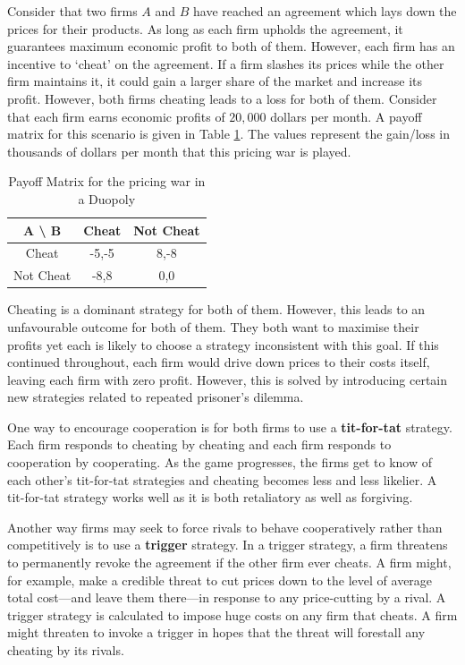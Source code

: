 \documentclass{article}
\theoremstyle{definition}
\begin{document}
Consider that two firms $A$ and $B$ have reached an agreement which lays down the prices for their products. As long as each firm upholds the agreement, it guarantees maximum economic profit to both of them. However, each firm has an incentive to `cheat' on the agreement. If a firm slashes its prices while the other firm maintains it, it could gain a larger share of the market and increase its profit. However, both firms cheating leads to a loss for both of them. Consider that each firm earns economic profits of $20,000$ dollars per month. A payoff matrix for this scenario is given in Table \ref{table:duopoly}. The values represent the gain/loss in thousands of dollars per month that this pricing war is played. 

\begin{table}[H]
    \begin{adjustbox}{width=5cm,center}
    \begin{tabular}{|c|c|c|}
        \hline
        A \textbackslash \: B & Cheat & Not Cheat \\
        \hline
        Cheat & -5,-5 & 8,-8 \\
        \hline 
        Not Cheat & -8,8 & 0,0  \\
        \hline
    \end{tabular}
    \end{adjustbox}
    \caption{Payoff Matrix for the pricing war in a Duopoly}
    \label{table:duopoly}
\end{table}

Cheating is a dominant strategy for both of them. However, this leads to an unfavourable outcome for both of them. They both want to maximise their profits yet each is likely to choose a strategy inconsistent with this goal. If this continued throughout, each firm would drive down prices to their costs itself, leaving each firm with zero profit. However, this is solved by introducing certain new strategies related to repeated prisoner's dilemma. \medskip

One way to encourage cooperation is for both firms to use a \textbf{tit-for-tat} strategy. Each firm responds to cheating by cheating and each firm responds to cooperation by cooperating. As the game progresses, the firms get to know of each other's tit-for-tat strategies and cheating becomes less and less likelier. A tit-for-tat strategy works well as it is both retaliatory as well as forgiving. \medskip

Another way firms may seek to force rivals to behave cooperatively rather than competitively is to use a \textbf{trigger} strategy. In a trigger strategy, a firm threatens to permanently revoke the agreement if the other firm ever cheats. A firm might, for example, make a credible threat to cut prices down to the level of average total cost—and leave them there—in response to any price-cutting by a rival. A trigger strategy is calculated to impose huge costs on any firm that cheats. A firm might threaten to invoke a trigger in hopes that the threat will forestall any cheating by its rivals.
\end{document}
